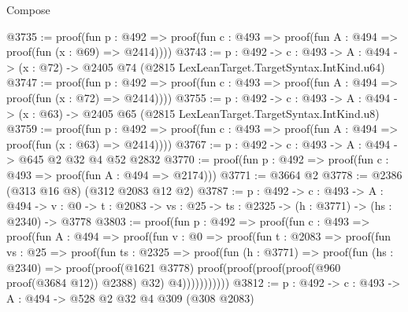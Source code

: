\begin{lexlean}{Compose}
\begin{coremodule}
@3735 := proof(fun {p : @492} =>
    proof(fun {c : @493} => proof(fun {A : @494} => proof(fun (x : @69) => @2414))))
@3743 := {p : @492} ->
  {c : @493} -> {A : @494} -> (x : @72) -> @2405 @74 (@2815 LexLeanTarget.TargetSyntax.IntKind.u64)
@3747 := proof(fun {p : @492} =>
    proof(fun {c : @493} => proof(fun {A : @494} => proof(fun (x : @72) => @2414))))
@3755 := {p : @492} ->
  {c : @493} -> {A : @494} -> (x : @63) -> @2405 @65 (@2815 LexLeanTarget.TargetSyntax.IntKind.u8)
@3759 := proof(fun {p : @492} =>
    proof(fun {c : @493} => proof(fun {A : @494} => proof(fun (x : @63) => @2414))))
@3767 := {p : @492} -> {c : @493} -> {A : @494} -> @645 @2 @32 @4 @52 @2832
@3770 := proof(fun {p : @492} => proof(fun {c : @493} => proof(fun {A : @494} => @2174)))
@3771 := @3664 @2
@3778 := @2386 (@313 @16 @8) (@312 @2083 @12 @2)
@3787 := {p : @492} ->
  {c : @493} ->
  {A : @494} ->
  {v : @0} -> {t : @2083} -> {vs : @25} -> {ts : @2325} -> (h : @3771) -> (hs : @2340) -> @3778
@3803 := proof(fun {p : @492} =>
    proof(fun {c : @493} =>
      proof(fun {A : @494} =>
        proof(fun {v : @0} =>
          proof(fun {t : @2083} =>
            proof(fun {vs : @25} =>
              proof(fun {ts : @2325} =>
                proof(fun (h : @3771) =>
                  proof(fun (hs : @2340) =>
                    proof(proof(@1621 @3778)
                        proof(proof(proof(proof(@960 proof(@3684 @12)) @2388) @32) @4)))))))))))
@3812 := {p : @492} -> {c : @493} -> {A : @494} -> @528 @2 @32 @4 @309 (@308 @2083)
\end{coremodule}
\end{lexlean}
